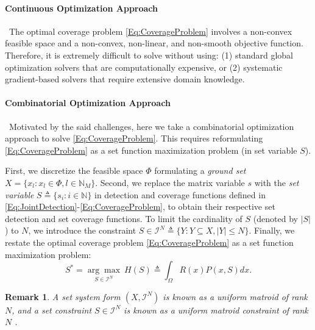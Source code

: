 \documentclass[letterpaper, 10 pt, conference]{ieeeconf}
\newcommand{\N}{\mathbb{N}}
\newtheorem{remark}{Remark}
\begin{document}
\paragraph*{Continuous Optimization Approach}\ 
The optimal coverage problem \eqref{Eq:CoverageProblem} involves a non-convex feasible space and a non-convex, non-linear, and non-smooth objective function. Therefore, it is extremely difficult to solve without using: (1) standard global optimization solvers that are computationally expensive, or (2) systematic gradient-based solvers that require extensive domain knowledge. 

\paragraph*{Combinatorial Optimization Approach}\ Motivated by the said challenges, here we take a combinatorial optimization approach to solve \eqref{Eq:CoverageProblem}. This requires reformulating \eqref{Eq:CoverageProblem} as a set function maximization problem (in set variable $S$).


First, we discretize the feasible space $\Phi$ formulating a \emph{ground set} $X = \{x_l:x_l\in \Phi, l\in\N_M\}$. Second, we replace the matrix variable $s$ with the \emph{set variable} $S \triangleq \{s_i:i\in\N\}$ in detection and coverage functions defined in \eqref{Eq:JointDetection}-\eqref{Eq:CoverageProblem}, to obtain their respective set detection and set coverage functions. To limit the cardinality of $S$ (denoted by $\vert S \vert$) to $N$, we introduce the constraint $S \in \mathcal{I}^N \triangleq \{Y: Y \subseteq X, \vert Y \vert \leq N\}$. Finally, we restate the optimal coverage problem \eqref{Eq:CoverageProblem} as a set function maximization problem:
\begin{equation}\label{Eq:SetCoverageProblem}
S^* = \underset{S\in\mathcal{I}^N}{\arg\max}\ H(S) \triangleq \int_\Omega R(x)P(x,S)dx.
\end{equation} 


\begin{remark}
A set system form $(X,\mathcal{I}^N)$ is known as a \emph{uniform matroid} of rank $N$, and a set constraint $S\in\mathcal{I}^N$ is known as a uniform matroid constraint of rank $N$ \cite{WelikalaJ02021}.
\end{remark}
\end{document}
